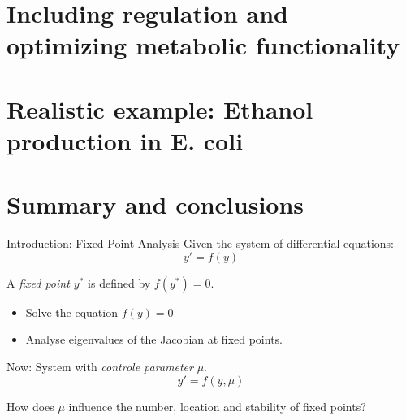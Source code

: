 \documentclass{beamer}
\begin{document}
\section{Including regulation and optimizing metabolic functionality}


\section{Realistic example: Ethanol production in E. coli}

\section{Summary and conclusions}

\begin{frame}{Introduction: Fixed Point Analysis}
    Given the system of differential equations:
    $$y' = f(y) $$
    \begin{definition}
        A \emph{fixed point $y^*$} is defined by $f(y^*)=0$.
    \end{definition}
    \begin{itemize}
        \item Solve the equation $f(y) = 0$ 
        \item Analyse eigenvalues of the Jacobian at fixed points.
    \end{itemize}
    Now: System with \emph{controle parameter} $\mu$. 
    $$y' = f(y, \mu)$${}    
    \begin{block}{}
        How does $\mu$ influence the number, location and stability of fixed points?
    \end{block}
\end{frame}
\end{document}
